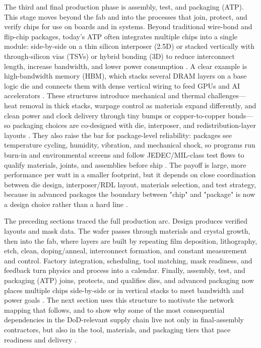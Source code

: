 The third and final production phase is assembly, test, and packaging (ATP). This stage moves beyond the fab and into the processes that join, protect, and verify chips for use on boards and in systems. Beyond traditional wire-bond and flip-chip packages, today's ATP often integrates multiple chips into a single module: side-by-side on a thin silicon interposer (2.5D) or stacked vertically with through-silicon vias (TSVs) or hybrid bonding (3D) to reduce interconnect length, increase bandwidth, and lower power consumption \parencite{garrou_handbook_2008}. A clear example is high-bandwidth memory (HBM), which stacks several DRAM layers on a base logic die and connects them with dense vertical wiring to feed GPUs and AI accelerators \parencite{jedec_jesd238_hbm3_2022}. These structures introduce mechanical and thermal challenges---heat removal in thick stacks, warpage control as materials expand differently, and clean power and clock delivery through tiny bumps or copper-to-copper bonds---so packaging choices are co-designed with die, interposer, and redistribution-layer layouts \parencite{ieee_electronics_packaging_society_heterogeneous_2024}. They also raise the bar for package-level reliability: packages see temperature cycling, humidity, vibration, and mechanical shock, so programs run burn-in and environmental screens and follow JEDEC/MIL-class test flows to qualify materials, joints, and assemblies before ship \parencite{bailey_reliability_2025,department_of_defense_test_2025}. The payoff is large, more performance per watt in a smaller footprint, but it depends on close coordination between die design, interposer/RDL layout, materials selection, and test strategy, because in advanced packages the boundary between "chip" and "package" is now a design choice rather than a hard line \parencite{ieee_electronics_packaging_society_heterogeneous_2024}.

The preceding sections traced the full production arc. Design produces verified layouts and mask data. The wafer passes through materials and crystal growth, then into the fab, where layers are built by repeating film deposition, lithography, etch, clean, doping/anneal, interconnect formation, and constant measurement and control. Factory integration, scheduling, tool matching, mask readiness, and feedback turn physics and process into a calendar. Finally, assembly, test, and packaging (ATP) joins, protects, and qualifies dies, and advanced packaging now places multiple chips side-by-side or in vertical stacks to meet bandwidth and power goals \parencite{varas_strengthening_2021,irds_factory_integration_technical_working_group_international_2023,ieee_electronics_packaging_society_heterogeneous_2024}. The next section uses this structure to motivate the network mapping that follows, and to show why some of the most consequential dependencies in the DoD-relevant supply chain live not only in final-assembly contractors, but also in the tool, materials, and packaging tiers that pace readiness and delivery \parencite{oecd_measuring_2019,khan_semiconductor_2021}.

